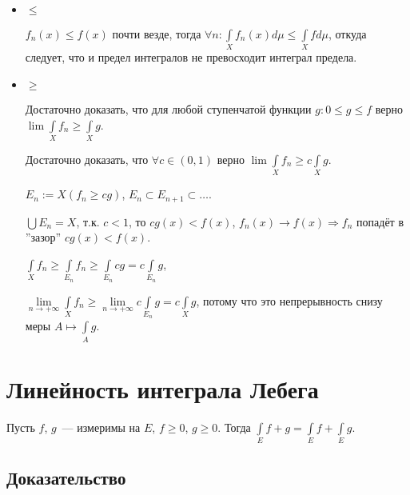 \documentclass{article}
\begin{document}
            \begin{itemize}
            
                \item $\leqslant$
                
                    $f_n(x) \leqslant f(x)$ почти везде, тогда $\forall n : \int\limits_{X} f_n(x) d \mu \leqslant \int\limits_{X} f d \mu$, откуда следует, что и предел интегралов не превосходит интеграл предела.
                    
                \item $\geqslant$
                
                    Достаточно доказать, что для любой ступенчатой функции $g : 0 \leqslant g \leqslant f$ верно $\lim \int\limits_{X} f_n \geqslant \int\limits_{X} g$.
                    
                    Достаточно доказать, что $\forall c \in (0, 1)$ верно $\lim \int\limits_{X} f_n \geqslant c \int\limits_{X} g$.
                    
                    $E_n := X \left( f_n \geqslant cg \right)$, $E_n \subset E_{n + 1} \subset \ldots$.
                    
                    $\bigcup E_n = X$, т.к. $c < 1$, то $c g(x) < f(x)$, $f_n(x) \rightarrow f(x) \Rightarrow f_n$ попадёт в ''зазор'' $c g(x) < f(x)$.
                    
                    $\int\limits_{X} f_n \geqslant \int\limits_{E_n} f_n \geqslant \int\limits_{E_n} c g = c \int\limits_{E_n} g$,
                    
                    $\lim\limits_{n \rightarrow +\infty} \int\limits_{X} f_n \geqslant \lim\limits_{n \rightarrow +\infty} c \int\limits_{E_n} g = c \int\limits_{X} g$, потому что это непрерывность снизу меры $A \mapsto \int\limits_{A} g$.
                    
            \end{itemize}
    
    \newpage
    
    \section{Линейность интеграла Лебега}
    
        Пусть $f$, $g$~--- измеримы на $E$, $f \geqslant 0$, $g \geqslant 0$. Тогда $\int\limits_{E} f + g = \int\limits_{E} f + \int\limits_{E} g$.
        
        \subsection{Доказательство}
        
\end{document}

